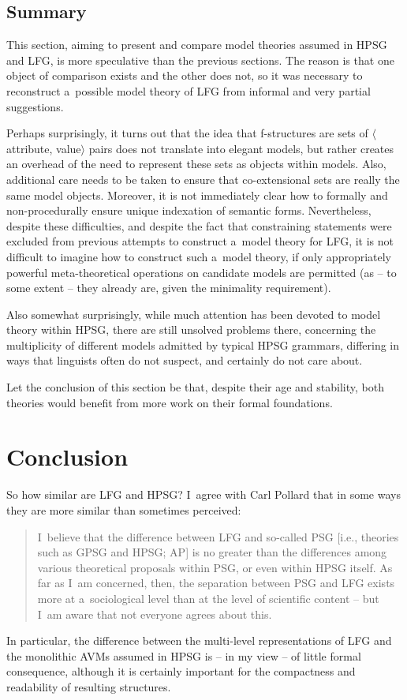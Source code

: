 \documentclass[output=paper,hidelinks]{langscibook}
\begin{document}
\subsection{Summary}
\label{sec:mod:sum}

This section, aiming to present and compare model theories assumed in HPSG and LFG, is more speculative than the previous sections.  The reason is that one object of comparison exists and the other does not, so it was necessary to reconstruct a~possible model theory of LFG from informal and very partial suggestions.

Perhaps surprisingly, it turns out that the idea that f-structures are sets of $\langle$attribute, value$\rangle$ pairs does not translate into elegant models, but rather creates an overhead of the need to represent these sets as objects within models.  Also, additional care needs to be taken to ensure that co-extensional sets are really the same model objects.  Moreover, it is not immediately clear how to formally and non-procedurally ensure unique indexation of semantic forms.  Nevertheless, despite these difficulties, and despite the fact that constraining statements were excluded from previous attempts to construct a~model theory for LFG, it is not difficult to imagine how to construct such a~model theory, if only appropriately powerful meta-theoretical operations on candidate models are permitted (as -- to some extent -- they already are, given the minimality requirement).

Also somewhat surprisingly, while much attention has been devoted to model theory within HPSG, there are still unsolved problems there, concerning the multiplicity of different models admitted by typical HPSG grammars, differing in ways that linguists often do not suspect, and certainly do not care about.

Let the conclusion of this section be that, despite their age and stability, both theories would benefit from more work on their formal foundations.


\section{Conclusion}
\label{sec:conc}

So how similar are LFG and HPSG?  I~agree with Carl Pollard that in some ways they are more similar than sometimes perceived:

\begin{quote}
  I~believe that the difference between LFG and so-called PSG [i.e., theories such as GPSG and HPSG; AP] is no greater than the differences among various theoretical proposals within PSG, or even within HPSG itself.  As far as I~am concerned, then, the separation between PSG and LFG exists more at a~sociological level than at the level of scientific content -- but I~am aware that not everyone agrees about this. \hspace*{\fill}\citep[4]{poll:97:nature}
\end{quote}
In particular, the difference between the multi-level representations of LFG and the monolithic AVMs assumed in HPSG is -- in my view -- of little formal consequence, although it is certainly important for the compactness and readability of resulting structures.  
\end{document}
